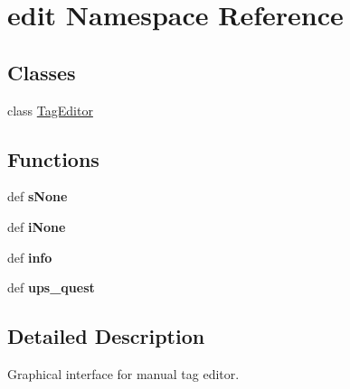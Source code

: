 \hypertarget{namespaceedit}{\section{edit Namespace Reference}
\label{namespaceedit}
}
\subsection*{Classes}
\begin{DoxyCompactItemize}
\item 
class \hyperlink{classedit_1_1TagEditor}{Tag\-Editor}
\end{DoxyCompactItemize}
\subsection*{Functions}
\begin{DoxyCompactItemize}
\item 
\hypertarget{namespaceedit_aa5e2ba93786984738464440f4c0caf6e}{def {\bfseries s\-None}}\label{namespaceedit_aa5e2ba93786984738464440f4c0caf6e}

\item 
\hypertarget{namespaceedit_ad34997d26392c5e40567d1740d899b54}{def {\bfseries i\-None}}\label{namespaceedit_ad34997d26392c5e40567d1740d899b54}

\item 
\hypertarget{namespaceedit_a4c503646fa860960558bb92a7934dfa3}{def {\bfseries info}}\label{namespaceedit_a4c503646fa860960558bb92a7934dfa3}

\item 
\hypertarget{namespaceedit_ae0e9b2633ec33fe8a6d74d9d009ebc9f}{def {\bfseries ups\-\_\-quest}}\label{namespaceedit_ae0e9b2633ec33fe8a6d74d9d009ebc9f}

\end{DoxyCompactItemize}


\subsection{Detailed Description}
\begin{DoxyVerb}Graphical interface for manual tag editor.
\end{DoxyVerb}
 